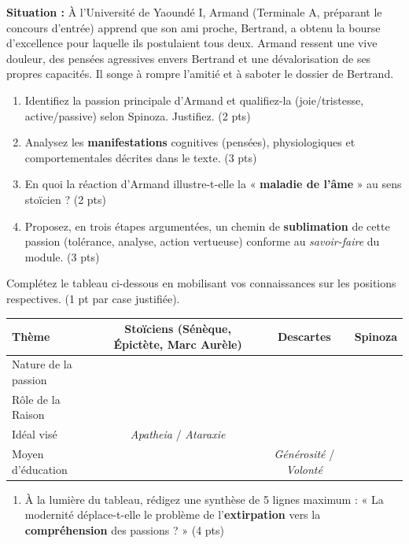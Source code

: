 \documentclass[11pt]{article}
\begin{document}
\begin{exercice}
\textbf{Situation :} À l'Université de Yaoundé I, Armand (Terminale A, préparant le concours d'entrée) apprend que son ami proche, Bertrand, a obtenu la bourse d'excellence pour laquelle ils postulaient tous deux. Armand ressent une vive douleur, des pensées agressives envers Bertrand et une dévalorisation de ses propres capacités. Il songe à rompre l'amitié et à saboter le dossier de Bertrand.
\begin{enumerate}
    \item Identifiez la passion principale d'Armand et qualifiez-la (joie/tristesse, active/passive) selon Spinoza. Justifiez. (2 pts)
    \item Analysez les \textbf{manifestations} cognitives (pensées), physiologiques et comportementales décrites dans le texte. (3 pts)
    \item En quoi la réaction d'Armand illustre-t-elle la « \textbf{maladie de l'âme} » au sens stoïcien ? (2 pts)
    \item Proposez, en trois étapes argumentées, un chemin de \textbf{sublimation} de cette passion (tolérance, analyse, action vertueuse) conforme au \textit{savoir-faire} du module. (3 pts)
\end{enumerate}
\end{exercice}

\begin{exercice}
Complétez le tableau ci-dessous en mobilisant vos connaissances sur les positions respectives. (1 pt par case justifiée).
\begin{center}
\begin{tabularx}{\linewidth}{|X|c|c|c|}
\hline
\textbf{Thème} & \textbf{Stoïciens (Sénèque, Épictète, Marc Aurèle)} & \textbf{Descartes} & \textbf{Spinoza} \\
\hline
Nature de la passion & & & \\
\hline
Rôle de la Raison & & & \\
\hline
Idéal visé & \textit{Apatheia} / \textit{Ataraxie} & & \\
\hline
Moyen d'éducation & & \textit{Générosité} / \textit{Volonté} & \\
\hline
\end{tabularx}
\end{center}
\begin{enumerate}
    \item À la lumière du tableau, rédigez une synthèse de 5 lignes maximum : « La modernité déplace-t-elle le problème de l'\textbf{extirpation} vers la \textbf{compréhension} des passions ? » (4 pts)
\end{enumerate}
\end{exercice}
\end{document}
